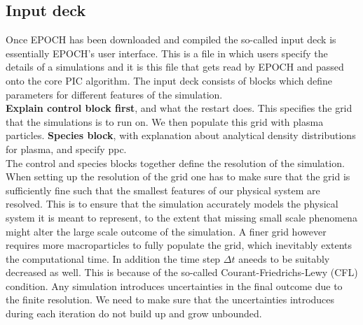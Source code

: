\subsection{Input deck}
Once EPOCH has been downloaded and compiled the so-called input deck is essentially EPOCH's user interface. This is a file in which users specify the details of a simulations and it is this file that gets read by EPOCH and passed onto the core PIC algorithm. The input deck consists of blocks which define parameters for different features of the simulation. \\
\textbf{Explain control block first}, and what the restart does.
This specifies the grid that the simulations is to run on. We then populate this grid with plasma particles.
\textbf{Species block}, with explanation about analytical density distributions for plasma, and specify ppc.\\
The control and species blocks together define the resolution of the simulation. When setting up the resolution of the grid one has to make sure that the grid is sufficiently fine such that the smallest features of our physical system are resolved. This is to ensure that the simulation accurately models the physical system it is meant to represent, to the extent that missing small scale phenomena might alter the large scale outcome of the simulation. A finer grid however requires more macroparticles to fully populate the grid, which inevitably extents the computational time. In addition the time step $\Delta t$ aneeds to be suitably decreased as well. This is because of the so-called Courant-Friedrichs-Lewy (CFL) condition.  Any simulation introduces uncertainties in the final outcome due to the finite resolution. We need to make sure that the uncertainties introduces during each iteration do not build up and grow unbounded. \\

